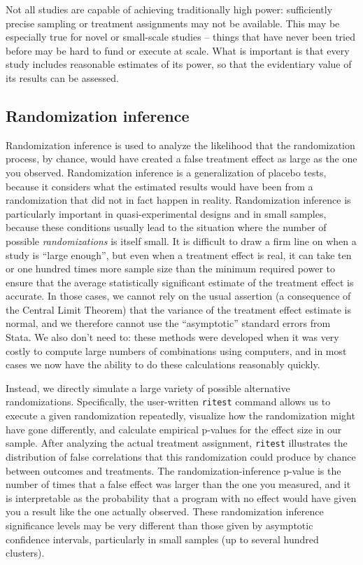 Not all studies are capable of achieving traditionally high power:
sufficiently precise sampling or treatment assignments may not be available.
This may be especially true for novel or small-scale studies --
things that have never been tried before may be hard to fund or execute at scale.
What is important is that every study includes reasonable estimates of its power,
so that the evidentiary value of its results can be assessed.

\subsection{Randomization inference}

Randomization inference is used to analyze the likelihood
that the randomization process, by chance,
would have created a false treatment effect as large as the one you observed.
Randomization inference is a generalization of placebo tests,
because it considers what the estimated results would have been
from a randomization that did not in fact happen in reality.
Randomization inference is particularly important
in quasi-experimental designs and in small samples,
because these conditions usually lead to the situation
where the number of possible \textit{randomizations} is itself small.
It is difficult to draw a firm line on when a study is ``large enough'',
but even when a treatment effect is real,
it can take ten or one hundred times more sample size
than the minimum required power
to ensure that the average statistically significant estimate
of the treatment effect is accurate.\cite{schwarzer2015small}
In those cases, we cannot rely on the usual assertion
(a consequence of the Central Limit Theorem)
that the variance of the treatment effect estimate is normal,
and we therefore cannot use the ``asymptotic'' standard errors from Stata.
We also don't need to: these methods were developed when it was very costly
to compute large numbers of combinations using computers,
and in most cases we now have the ability to do these calculations reasonably quickly.

Instead, we directly simulate a large variety of possible alternative randomizations.
Specifically, the user-written \texttt{ritest} command
allows us to execute a given randomization repeatedly,
visualize how the randomization might have gone differently,
and calculate empirical p-values for the effect size in our sample.
After analyzing the actual treatment assignment,
\texttt{ritest} illustrates the distribution of false correlations
that this randomization could produce by chance
between outcomes and treatments.
The randomization-inference p-value is the number of times
that a false effect was larger than the one you measured,
and it is interpretable as the probability that a program with no effect
would have given you a result like the one actually observed.
These randomization inference
significance levels may be very different
than those given by asymptotic confidence intervals,
particularly in small samples (up to several hundred clusters).

